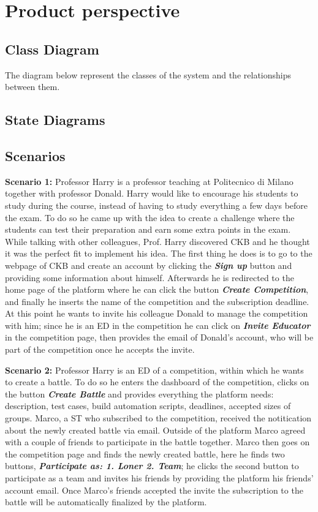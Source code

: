 \section{Product perspective}
\label{s:Product_perspective}%

\subsection{Class Diagram}
\label{ss:class_diagram}%
The diagram below represent the classes of the system and the relationships between them.

\subsection{State Diagrams}
\label{ss:state_diagrams}%

\subsection{Scenarios}
\label{ss:scenarios}%
\textbf{Scenario 1:} Professor Harry is a professor teaching at Politecnico di Milano together with professor Donald. Harry would like to encourage his students to study during the course, instead of having to study everything a few days before the exam. To do so he came up with the idea to create a challenge where the students can test their preparation and earn some extra points in the exam. While talking with other colleagues, Prof. Harry discovered CKB and he thought it was the perfect fit to implement his idea. The first thing he does is to go to the webpage of CKB and create an account by clicking the \textbf{\textit{Sign up}} button and providing some information about himself. Afterwards he is redirected to the home page of the platform where he can click the button \textbf{\textit{Create Competition}}, and finally he inserts the name of the competition and the subscription deadline. At this point he wants to invite his colleague Donald to manage the competition with him; since he is an ED in the competition he can click on \textbf{\textit{Invite Educator}} in the competition page, then provides the email of Donald's account, who will be part of the competition once he accepts the invite.


\textbf{Scenario 2:} Professor Harry is an ED of a competition, within which he wants to create a battle. To do so he enters the dashboard of the competition, clicks on the button \textbf{\textit{Create Battle}} and provides everything the platform needs: description, test cases, build automation scripts, deadlines, accepted sizes of groups. Marco, a ST who subscribed to the competition, received the notitication about the newly created battle via email. Outside of the platform Marco agreed with a couple of friends to participate in the battle together. Marco then goes on the competition page and finds the newly created battle, here he finds two buttons, \textbf{\textit{Participate as: 1. Loner 2. Team}}; he clicks the second button to participate as a team and invites his friends by providing the platform his friends' account email. Once Marco's friends accepted the invite the subscription to the battle will be automatically finalized by the platform.


